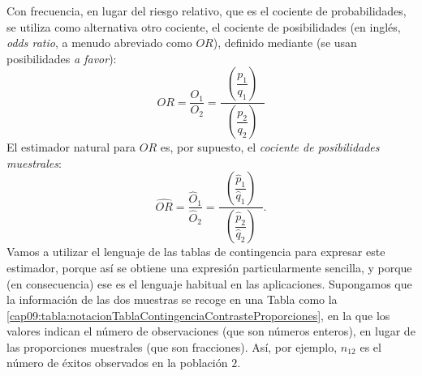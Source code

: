 Con frecuencia, en lugar del riesgo relativo, que es el cociente de probabilidades, se utiliza como alternativa otro cociente, el {\sf cociente de posibilidades} (en inglés, {\em odds ratio}, a menudo abreviado como $OR$), definido mediante (se usan posibilidades {\em a favor}):
\begin{equation}
\label{cap09:ecu:DefinicionOddsRatio}
OR=\dfrac{O_1}{O_2}=\dfrac{\phantom{a}\left(\dfrac{p_1}{q_1}\right)\phantom{a}}{\left(\dfrac{p_2}{q_2}\right)}
\end{equation}
El estimador natural para $OR$ es, por supuesto, el {\em cociente de posibilidades muestrales}:
\[
\widehat{OR}=
\dfrac{\hat O_1}{\hat O_2}=
\dfrac{\phantom{a}\left(\dfrac{\hat p_1}{\hat q_1}\right)\phantom{a}}
{\left(\dfrac{\hat p_2}{\hat q_2}\right)}.
\]
Vamos a utilizar el lenguaje de las tablas de contingencia para expresar este estimador, porque así se obtiene una expresión particularmente sencilla, y porque (en consecuencia) ese es el lenguaje habitual en las aplicaciones. Supongamos que la información de las dos muestras se recoge en una Tabla como la \ref{cap09:tabla:notacionTablaContingenciaContrasteProporciones}, en la que los valores indican el número de observaciones (que son números enteros), en lugar de las proporciones muestrales (que son fracciones). Así, por ejemplo, $n_{12}$ es el número de éxitos observados en la población $2$.

